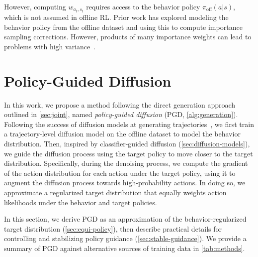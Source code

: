 \documentclass[10pt]{article} %
\theoremstyle{plain}
\theoremstyle{definition}
\theoremstyle{remark}
\begin{document}
However, computing $w_{a_t, s_t}$ requires access to the behavior policy $\pi_{\text{off}}(a|s)$, which is not assumed in offline RL.
Prior work has explored modeling the behavior policy from the offline dataset and using this to compute importance sampling corrections.
However, products of many importance weights can lead to problems with high variance~\citep{10.5555/645529.658134, levine2020offline}.



\section{Policy-Guided Diffusion\label{sec:method}}

In this work, we propose a method following the direct generation approach outlined in \autoref{sec:joint}, named \textit{policy-guided diffusion} (PGD, \autoref{alg:generation}).
Following the success of diffusion models at generating trajectories~\citep{janner2022diffuser, lu2023synthetic}, we first train a trajectory-level diffusion model on the offline dataset to model the behavior distribution.
Then, inspired by classifier-guided diffusion (\autoref{sec:diffusion-models}), we guide the diffusion process using the target policy to move closer to the target distribution.
Specifically, during the denoising process, we compute the gradient of the action distribution for each action under the target policy, using it to augment the diffusion process towards high-probability actions.
In doing so, we approximate a regularized target distribution that equally weights action likelihoods under the behavior and target policies.

In this section, we derive PGD as an approximation of the behavior-regularized target distribution (\autoref{sec:equi-policy}), then describe practical details for controlling and stabilizing policy guidance (\autoref{sec:stable-guidance}). We provide a summary of PGD against alternative sources of training data in \autoref{tab:methods}.
\end{document}
